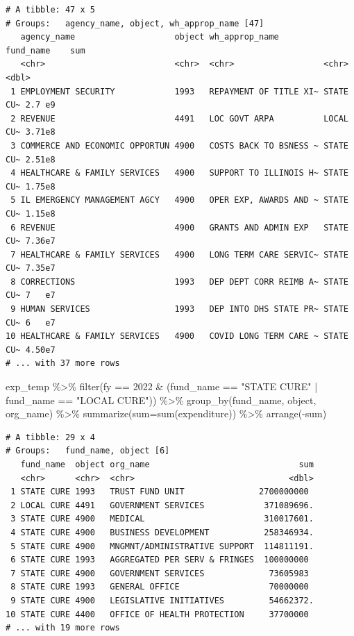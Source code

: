 \documentclass[
  letterpaper,
  DIV=11,
  numbers=noendperiod]{scrreport}
\newenvironment{Shaded}{\begin{snugshade}}{\end{snugshade}}
\newcommand{\AttributeTok}[1]{\textcolor[rgb]{0.40,0.45,0.13}{#1}}
\newcommand{\DecValTok}[1]{\textcolor[rgb]{0.68,0.00,0.00}{#1}}
\newcommand{\FunctionTok}[1]{\textcolor[rgb]{0.28,0.35,0.67}{#1}}
\newcommand{\NormalTok}[1]{\textcolor[rgb]{0.00,0.23,0.31}{#1}}
\newcommand{\SpecialCharTok}[1]{\textcolor[rgb]{0.37,0.37,0.37}{#1}}
\newcommand{\StringTok}[1]{\textcolor[rgb]{0.13,0.47,0.30}{#1}}
\begin{document}
\begin{verbatim}
# A tibble: 47 x 5
# Groups:   agency_name, object, wh_approp_name [47]
   agency_name                    object wh_approp_name         fund_name    sum
   <chr>                          <chr>  <chr>                  <chr>      <dbl>
 1 EMPLOYMENT SECURITY            1993   REPAYMENT OF TITLE XI~ STATE CU~ 2.7 e9
 2 REVENUE                        4491   LOC GOVT ARPA          LOCAL CU~ 3.71e8
 3 COMMERCE AND ECONOMIC OPPORTUN 4900   COSTS BACK TO BSNESS ~ STATE CU~ 2.51e8
 4 HEALTHCARE & FAMILY SERVICES   4900   SUPPORT TO ILLINOIS H~ STATE CU~ 1.75e8
 5 IL EMERGENCY MANAGEMENT AGCY   4900   OPER EXP, AWARDS AND ~ STATE CU~ 1.15e8
 6 REVENUE                        4900   GRANTS AND ADMIN EXP   STATE CU~ 7.36e7
 7 HEALTHCARE & FAMILY SERVICES   4900   LONG TERM CARE SERVIC~ STATE CU~ 7.35e7
 8 CORRECTIONS                    1993   DEP DEPT CORR REIMB A~ STATE CU~ 7   e7
 9 HUMAN SERVICES                 1993   DEP INTO DHS STATE PR~ STATE CU~ 6   e7
10 HEALTHCARE & FAMILY SERVICES   4900   COVID LONG TERM CARE ~ STATE CU~ 4.50e7
# ... with 37 more rows
\end{verbatim}

\begin{Shaded}
\begin{Highlighting}[]
\NormalTok{exp\_temp }\SpecialCharTok{\%\textgreater{}\%} \FunctionTok{filter}\NormalTok{(fy }\SpecialCharTok{==} \DecValTok{2022} \SpecialCharTok{\&}\NormalTok{ (fund\_name }\SpecialCharTok{==} \StringTok{"STATE CURE"} \SpecialCharTok{|}\NormalTok{ fund\_name }\SpecialCharTok{==} \StringTok{"LOCAL CURE"}\NormalTok{)) }\SpecialCharTok{\%\textgreater{}\%} \FunctionTok{group\_by}\NormalTok{(fund\_name, object, org\_name) }\SpecialCharTok{\%\textgreater{}\%} \FunctionTok{summarize}\NormalTok{(}\AttributeTok{sum=}\FunctionTok{sum}\NormalTok{(expenditure)) }\SpecialCharTok{\%\textgreater{}\%} \FunctionTok{arrange}\NormalTok{(}\SpecialCharTok{{-}}\NormalTok{sum)}
\end{Highlighting}
\end{Shaded}

\begin{verbatim}
# A tibble: 29 x 4
# Groups:   fund_name, object [6]
   fund_name  object org_name                              sum
   <chr>      <chr>  <chr>                               <dbl>
 1 STATE CURE 1993   TRUST FUND UNIT               2700000000 
 2 LOCAL CURE 4491   GOVERNMENT SERVICES            371089696.
 3 STATE CURE 4900   MEDICAL                        310017601.
 4 STATE CURE 4900   BUSINESS DEVELOPMENT           258346934.
 5 STATE CURE 4900   MNGMNT/ADMINISTRATIVE SUPPORT  114811191.
 6 STATE CURE 1993   AGGREGATED PER SERV & FRINGES  100000000 
 7 STATE CURE 4900   GOVERNMENT SERVICES             73605983 
 8 STATE CURE 1993   GENERAL OFFICE                  70000000 
 9 STATE CURE 4900   LEGISLATIVE INITIATIVES         54662372.
10 STATE CURE 4400   OFFICE OF HEALTH PROTECTION     37700000 
# ... with 19 more rows
\end{verbatim}
\end{document}
